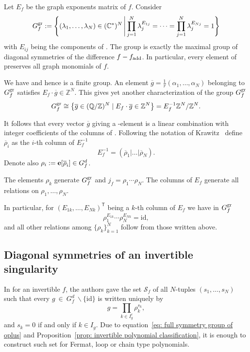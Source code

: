 \documentclass[10pt,a4paper]{amsart}
\numberwithin{equation}{section}
\newcommand{\CC}{{\mathbb{C}}}
\newcommand{\QQ}{{\mathbb{Q}}}
\newcommand{\ZZ}{{\mathbb{Z}}}
\newcommand{\calS}{{\mathcal S}}
\newcommand{\epi}{{\bf e}}
\newcommand{\id}{\mathrm{id}}
\begin{document}
Let $E_f$ be the graph exponents matrix of $f$. Consider
\begin{equation*}
G_f^{\rm gr} := \Biggl\{(\lambda_1,\dots,\lambda_N)\in (\CC^*)^N \, \Biggl|\, \prod_{j=1}^N \lambda_j ^{E_{1j}}=\dots =\prod_{j=1}^N\lambda_j^{E_{Nj}}=1 \Biggr\} \end{equation*}
with $E_{ij}$ being the components of .
The group  is exactly the maximal group of diagonal symmetries of the difference $f-f_{\rm add}$. In particular, every element of  preserves all graph monomials of $f$.

We have  and hence  is a finite group.
An element ${\overline g = \frac{1}{r}(\alpha_1,\dots,\alpha_N)}$ belonging to $G_f^{\rm gr}$ satisfies
$E_f \cdot \overline g \in \ZZ^N$.
This gives yet another characterization of the group $G_f^{\rm gr}$
\begin{equation*}%
	G_f^{\rm gr} \cong \bigl\lbrace \overline g \in (\QQ/\ZZ)^N \mid E_f \cdot \overline g \in \ZZ^N \bigr\rbrace = E_f^{-1} \ZZ^N / \ZZ^N.
\end{equation*}

It follows that every vector $\overline g$ giving a -element is a linear combination with integer coefficients of the columns of . Following the notation of Krawitz~\cite{K09} define $\overline \rho_i$ as the $i$-th column of $E_f^{-1}$
\begin{equation*}
	E_f^{-1} =  ( \overline \rho_1 | \dots | \overline \rho_N  ).
\end{equation*}
Denote also $\rho_i := \epi[\overline \rho_i] \in G_f^d$.

The elements $\rho_k$ generate $G_f^{\rm gr}$ and $j_f = \rho_1\cdots\rho_N$.
The columns of $E_f$ generate all relations on $\rho_1, \dots, \rho_N$.

In particular, for $(E_{1k}, \dots, E_{Nk})^{\mathsf{T}}$ being a $k$-th column of $E_f$ we have in $G_f^{\rm gr}$
\[
\rho_1^{E_{1k}}\cdots \rho_N^{E_{Nk}} = \id,
\]
and all other relations among $\lbrace \rho_k \rbrace_{k=1}^N$ follow from those written above.

\subsection{Diagonal symmetries of an invertible singularity}

In \cite{FJJS} for an invertible $f$, the authors gave the set $\calS_f$ of all $N$-tuples $(s_1,\dots,s_N)$ such that every $g~\in~G_f^d~\backslash\lbrace\id\rbrace$ is written uniquely by
\[
	g = \prod_{k \in I_g^c} \rho_k^{s_k},
\]
and $s_k = 0$ if and only if $k \in I_g$. Due to equation~\eqref{eq: full symmetry group of oplus} and Proposition~\ref{prop: invertible polynomial classification}, it is enough to construct such set for Fermat, loop or chain type polynomials.
\end{document}
